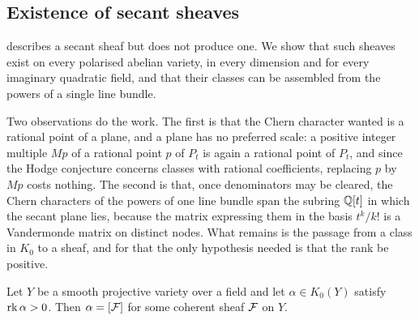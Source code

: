 \subsection{Existence of secant sheaves}\label{ssec:thirdexists}

 describes a secant sheaf but does not produce one.
We show that such sheaves exist on every polarised abelian variety, in
every dimension and for every imaginary quadratic field, and that their
classes can be assembled from the powers of a single line bundle.

Two observations do the work. The first is that the Chern character wanted is
a rational point of a plane, and a plane has no preferred scale: a positive
integer multiple $Mp$ of a rational point $p$ of $P_{t}$ is again a rational
point of $P_{t}$, and since the Hodge conjecture concerns classes with
rational coefficients, replacing $p$ by $Mp$ costs nothing. The second is
that, once denominators may be cleared, the Chern characters of the powers of
one line bundle span the subring $\mathbb{Q}[t]$ in which the secant plane lies,
because the matrix expressing them in the basis $t^{k}/k!$ is a Vandermonde
matrix on distinct nodes. What remains is the passage from a class in $K_{0}$
to a sheaf, and for that the only hypothesis needed is that the rank be
positive.

\begin{lemma}\label{lem:posrank}
Let $Y$ be a smooth projective variety over a field and let $\alpha\in
K_{0}(Y)$ satisfy $\operatorname{rk}\alpha>0$. Then $\alpha=[\mathcal{F}]$ for some coherent sheaf
$\mathcal{F}$ on $Y$.
\end{lemma}


